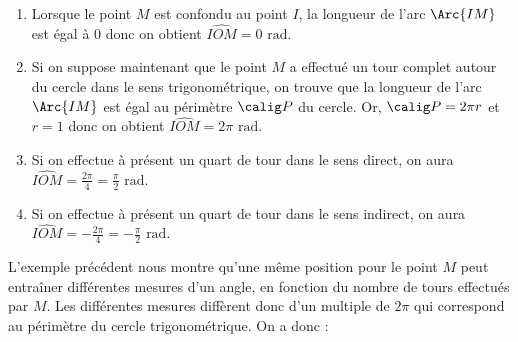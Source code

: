 \documentclass[10pt,openright,twoside,french]{book}
\begin{document}
\begin{Exemple}[s]
\begin{enumerate}
    \item Lorsque le point $M$ est confondu au point $I$, la longueur de l'arc $\Arc{IM}$ est égal à $0$ donc on obtient $\widehat{IOM} = 0 \text{ rad}$.
    \item Si on suppose maintenant que le point $M$ a effectué un tour complet autour du cercle dans le sens trigonométrique, on trouve que la longueur de l'arc $\Arc{IM}$ est égal au périmètre $\calig P$ du cercle. Or, $\calig P = 2\pi r$ et $r = 1$ donc on obtient $\widehat{IOM} = 2\pi \text{ rad}$.
    \item Si on effectue à présent un quart de tour dans le sens direct, on aura $\widehat{IOM} = \frac{2\pi}{4} = \frac\pi2 \text{ rad}$.
    \item Si on effectue à présent un quart de tour dans le sens indirect, on aura $\widehat{IOM} = -\frac{2\pi}{4} = -\frac\pi2 \text{ rad}$.
\begin{center}
    \end{center}
\end{enumerate}
\end{Exemple}\medskip

L'exemple précédent nous montre qu'une même position pour le point $M$ peut entraîner différentes mesures d'un angle, en fonction du nombre de tours effectués par $M$. Les différentes mesures diffèrent donc d'un multiple de $2\pi$ qui correspond au périmètre du cercle trigonométrique. On a donc :
\end{document}
